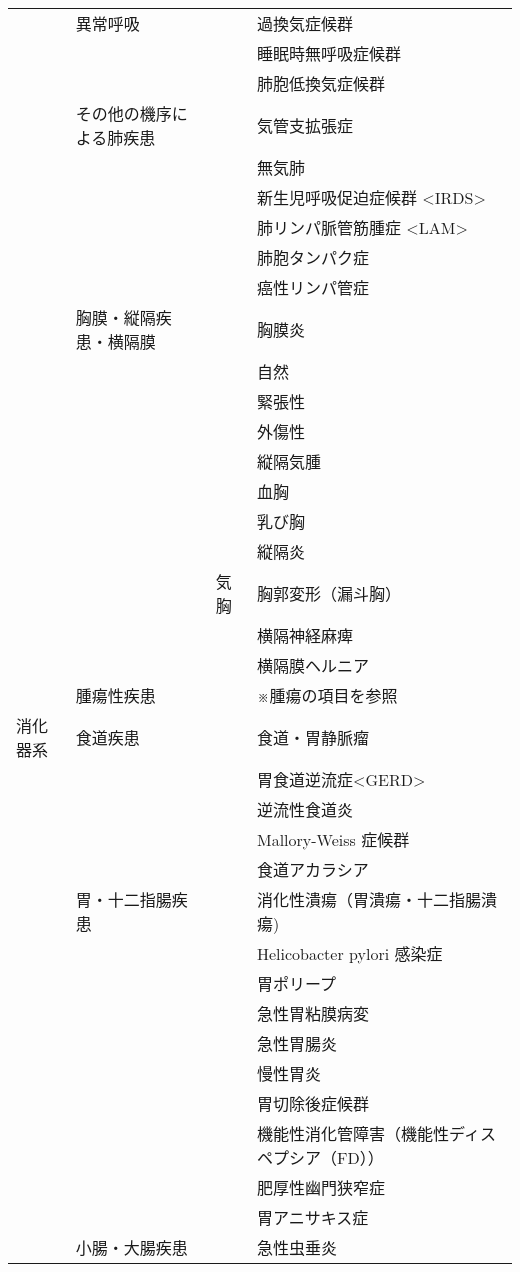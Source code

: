 \begin{xltabular}{\linewidth}{XXXX}
 & 異常呼吸 &  & 過換気症候群 \\
 &  &  & 睡眠時無呼吸症候群 \\
 &  &  & 肺胞低換気症候群 \\
 & その他の機序による肺疾患 &  & 気管支拡張症 \\
 &  &  & 無気肺 \\
 &  &  & 新生児呼吸促迫症候群 <IRDS> \\
 &  &  & 肺リンパ脈管筋腫症 <LAM> \\
 &  &  & 肺胞タンパク症 \\
 &  &  & 癌性リンパ管症 \\
 & 胸膜・縦隔疾患・横隔膜 &  & 胸膜炎 \\
 &  &  & 自然 \\
 &  &  & 緊張性 \\
 &  &  & 外傷性 \\
 &  &  & 縦隔気腫 \\
 &  &  & 血胸 \\
 &  &  & 乳び胸 \\
 &  &  & 縦隔炎 \\
 &  & 気胸 & 胸郭変形（漏斗胸） \\
 &  &  & 横隔神経麻痺 \\
 &  &  & 横隔膜ヘルニア \\
 & 腫瘍性疾患 &  & ※腫瘍の項目を参照 \\
消化器系 & 食道疾患 &  & 食道・胃静脈瘤 \\
 &  &  & 胃食道逆流症<GERD>  \\
 &  &  & 逆流性食道炎 \\
 &  &  & Mallory-Weiss 症候群 \\
 &  &  & 食道アカラシア \\
 & 胃・十二指腸疾患 &  & 消化性潰瘍（胃潰瘍・十二指腸潰瘍) \\
 &  &  & Helicobacter pylori 感染症 \\
 &  &  & 胃ポリープ \\
 &  &  & 急性胃粘膜病変 \\
 &  &  & 急性胃腸炎 \\
 &  &  & 慢性胃炎 \\
 &  &  & 胃切除後症候群 \\
 &  &  & 機能性消化管障害（機能性ディスペプシア（FD）） \\
 &  &  & 肥厚性幽門狭窄症 \\
 &  &  & 胃アニサキス症 \\
 & 小腸・大腸疾患 &  & 急性虫垂炎 \\

\end{xltabular}

